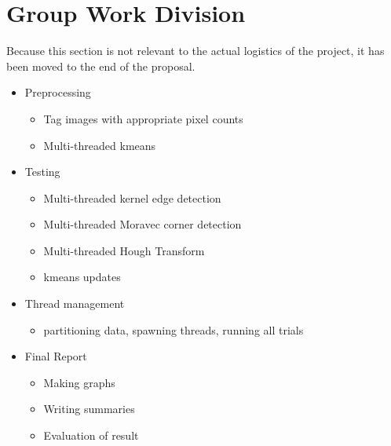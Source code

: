 \documentclass{article}
\begin{document}
        
\section{Group Work Division}
    Because this section is not relevant to the actual logistics of the project, it has been moved to the end of the proposal.
    \begin{itemize}
    \item Preprocessing
        \begin{itemize}
        \item Tag images with appropriate pixel counts
        \item Multi-threaded kmeans
        \end{itemize}
        
    \item Testing
        \begin{itemize}
        \item Multi-threaded kernel edge detection
        \item Multi-threaded Moravec corner detection
        \item Multi-threaded Hough Transform
        \item kmeans updates
        \end{itemize}
        
    \item Thread management
        \begin{itemize}
        \item partitioning data, spawning threads, running all trials
        \end{itemize}
        
    \item Final Report
        \begin{itemize}
        \item Making graphs
        \item Writing summaries
        \item Evaluation of result
        \end{itemize}
        
    \end{itemize}
\end{document}
